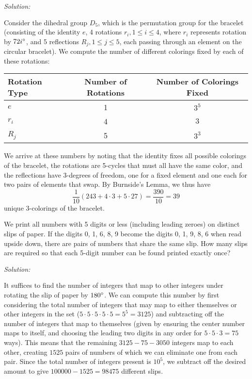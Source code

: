 \documentclass[12pt]{scrartcl}
\newenvironment{problem}[2][Problem]{\begin{trivlist}
\item[\hskip \labelsep {\bfseries #1}\hskip \labelsep {\bfseries #2.}]}{\end{trivlist}}
\newenvironment{solution}
    {\emph{Solution:}
    }
    {
    \qedhere
    }
\begin{document}
\begin{solution}
Consider the dihedral group $D_5$, which is the permutation group for the bracelet (consisting of the identity $e$, 4 rotations $r_i, 1 \leq i \leq 4$, where $r_i$ represents rotation by $72i^\circ$, and 5 reflections $R_j, 1 \leq j \leq 5$, each passing through an element on the circular bracelet). We compute the number of different colorings fixed by each of these rotations:  

\begin{center}
\begin{tabular}{m{5cm}| c | c}
\centering Rotation Type & Number of Rotations & Number of Colorings Fixed \\ \hline 
\centering $e$ & 1 & $3^5$ \\ 
\centering $r_i$ & 4 & $3$ \\
\centering $R_j$ & 5 & $3^3$ \\
\end{tabular}
\end{center} 
We arrive at these numbers by noting that the identity fixes all possible colorings of the bracelet, the rotations are 5-cycles that must all have the same color, and the reflections have 3-degrees of freedom, one for a fixed element and one each for two pairs of elements that swap. By Burnside's Lemma, we thus have 
\[
	\frac{1}{10}(243 + 4 \cdot 3 + 5 \cdot 27) = \frac{390}{10} = \boxed{39}
\]
unique 3-colorings of the bracelet. 
\end{solution}

\begin{problem}{10} 
We print all numbers with 5 digits or less (including leading zeroes) on distinct slips of paper. If the digits 0, 1, 6, 8, 9 become the digits 0, 1, 9, 8, 6 when read upside down, there are pairs of numbers that share the same slip. How many slips are required so that each 5-digit number can be found printed exactly once? 

\end{problem}

\begin{solution}
It suffices to find the number of integers that map to other integers under rotating the slip of paper by $180^\circ$. We can compute this number by first considering the total number of integers that may map to either themselves or other integers in the set ($5 \cdot 5 \cdot 5 \cdot 5 \cdot 5 = 5^5 = 3125$) and subtracting off the number of integers that map to themselves (given by ensuring the center number maps to itself, and choosing the leading two digits in any order for $5 \cdot 5 \cdot 3 = 75$ ways). This means that the remaining $3125 - 75 - 3050$ integers map to each other, creating $1525$ pairs of numbers of which we can eliminate one from each pair. Since the total number of integers present is $10^5$, we subtract off the desired amount to give $100000 - 1525 = \boxed{98475}$ different slips. 
\end{solution}
\end{document}
